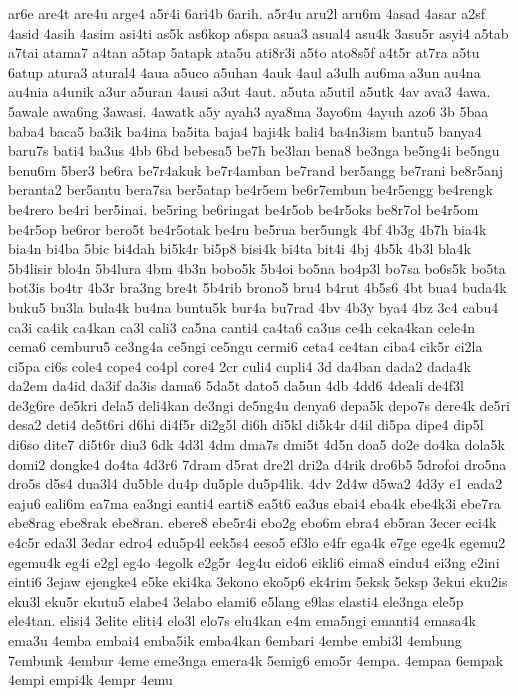 ar6e
are4t
are4u
arge4
a5r4i
6ari4b
6arih.
a5r4u
aru2l
aru6m
4asad
4asar
a2sf
4asid
4asih
4asim
asi4ti
as5k
as6kop
a6spa
asua3
asual4
asu4k
3asu5r
asyi4
a5tab
a7tai
atama7
a4tan
a5tap
5atapk
ata5u
ati8r3i
a5to
ato8s5f
a4t5r
at7ra
a5tu
6atup
atura3
atural4
4aua
a5uco
a5uhan
4auk
4aul
a3ulh
au6ma
a3un
au4na
au4nia
a4unik
a3ur
a5uran
4ausi
a3ut
4aut.
a5uta
a5util
a5utk
4av
ava3
4awa.
5awale
awa6ng
3awasi.
4awatk
a5y
ayah3
aya8ma
3ayo6m
4ayuh
azo6
3b
5baa
baba4
baca5
ba3ik
ba4ina
ba5ita
baja4
baji4k
bali4
ba4n3ism
bantu5
banya4
baru7s
bati4
ba3us
4bb
6bd
bebesa5
be7h
be3lan
bena8
be3nga
be5ng4i
be5ngu
benu6m
5ber3
be6ra
be7r4akuk
be7r4amban
be7rand
ber5angg
be7rani
be8r5anj
beranta2
ber5antu
bera7sa
ber5atap
be4r5em
be6r7embun
be4r5engg
be4rengk
be4rero
be4ri
ber5inai.
be5ring
be6ringat
be4r5ob
be4r5oks
be8r7ol
be4r5om
be4r5op
be6ror
bero5t
be4r5otak
be4ru
be5rua
ber5ungk
4bf
4b3g
4b7h
bia4k
bia4n
bi4ba
5bic
bi4dah
bi5k4r
bi5p8
bisi4k
bi4ta
bit4i
4bj
4b5k
4b3l
bla4k
5b4lisir
blo4n
5b4lura
4bm
4b3n
bobo5k
5b4oi
bo5na
bo4p3l
bo7sa
bo6s5k
bo5ta
bot3is
bo4tr
4b3r
bra3ng
bre4t
5b4rib
brono5
bru4
b4rut
4b5s6
4bt
bua4
buda4k
buku5
bu3la
bula4k
bu4na
buntu5k
bur4a
bu7rad
4bv
4b3y
bya4
4bz
3c4
cabu4
ca3i
ca4ik
ca4kan
ca3l
cali3
ca5na
canti4
ca4ta6
ca3us
ce4h
ceka4kan
cele4n
cema6
cemburu5
ce3ng4a
ce5ngi
ce5ngu
cermi6
ceta4
ce4tan
ciba4
cik5r
ci2la
ci5pa
ci6s
cole4
cope4
co4pl
core4
2cr
culi4
cupli4
3d
da4ban
dada2
dada4k
da2em
da4id
da3if
da3is
dama6
5da5t
dato5
da5un
4db
4dd6
4deali
de4f3l
de3g6re
de5kri
dela5
deli4kan
de3ngi
de5ng4u
denya6
depa5k
depo7s
dere4k
de5ri
desa2
deti4
de5t6ri
d6hi
di4f5r
di2g5l
di6h
di5kl
di5k4r
d4il
di5pa
dipe4
dip5l
di6so
dite7
di5t6r
diu3
6dk
4d3l
4dm
dma7s
dmi5t
4d5n
doa5
do2e
do4ka
dola5k
domi2
dongke4
do4ta
4d3r6
7dram
d5rat
dre2l
dri2a
d4rik
dro6b5
5drofoi
dro5na
dro5s
d5s4
dua3l4
du5ble
du4p
du5ple
du5p4lik.
4dv
2d4w
d5wa2
4d3y
e1
eada2
eaju6
eali6m
ea7ma
ea3ngi
eanti4
earti8
ea5t6
ea3us
ebai4
eba4k
ebe4k3i
ebe7ra
ebe8rag
ebe8rak
ebe8ran.
ebere8
ebe5r4i
ebo2g
ebo6m
ebra4
eb5ran
3ecer
eci4k
e4c5r
eda3l
3edar
edro4
edu5p4l
eek5s4
eeso5
ef3lo
e4fr
ega4k
e7ge
ege4k
egemu2
egemu4k
eg4i
e2gl
eg4o
4egolk
e2g5r
4eg4u
eido6
eikli6
eima8
eindu4
ei3ng
e2ini
einti6
3ejaw
ejengke4
e5ke
eki4ka
3ekono
eko5p6
ek4rim
5eksk
5eksp
3ekui
eku2is
eku3l
eku5r
ekutu5
elabe4
3elabo
elami6
e5lang
e9las
elasti4
ele3nga
ele5p
ele4tan.
elisi4
3elite
eliti4
elo3l
elo7s
elu4kan
e4m
ema5ngi
emanti4
emasa4k
ema3u
4emba
embai4
emba5ik
emba4kan
6embari
4embe
embi3l
4embung
7embunk
4embur
4eme
eme3nga
emera4k
5emig6
emo5r
4empa.
4empaa
6empak
4empi
empi4k
4empr
4emu
